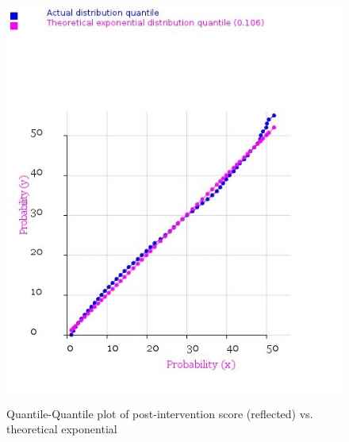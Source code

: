 \documentclass[10pt]{article}
\begin{document}
\begin{figure}
\caption{Quantile-Quantile plot of post-intervention score (reflected) vs. theoretical exponential}
\label{QQPlotPostVsExponential}
\begin{center}
\includegraphics[width=120mm]{ReportMedia/QQPlotPostVsExponential.jpg}\\
\end{center}
\end{figure}
\end{document}

